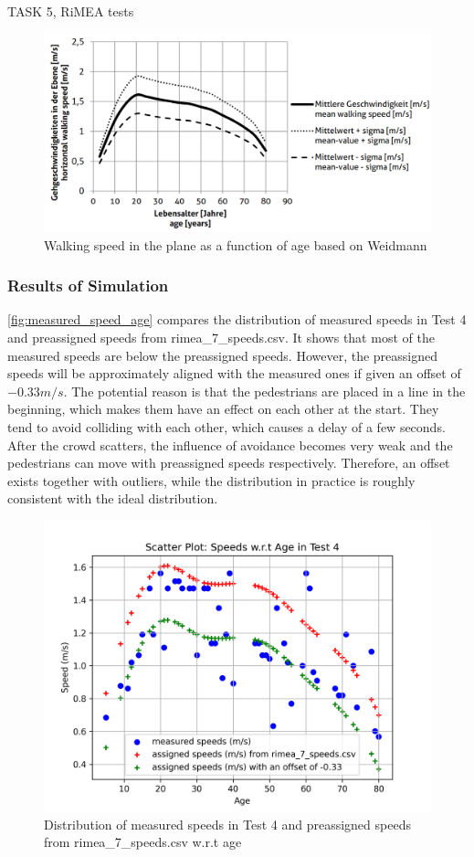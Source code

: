 \documentclass[10pt,a4paper]{article}
\begin{document}
\begin{task}{TASK 5, RiMEA tests}
\begin{figure}
    \centering
    \includegraphics[width=0.75\linewidth]{pictures/speed_age.png}
    \caption{Walking speed in the plane as a function of age based on Weidmann}
    \label{fig:speed_age}
\end{figure}

\subsubsection{Results of Simulation}

\autoref{fig:measured_speed_age} compares the distribution of measured speeds in Test 4 and preassigned speeds from rimea\_7\_speeds.csv. It shows that most of the measured speeds are below the preassigned speeds. However, the preassigned speeds will be approximately aligned with the measured ones if given an offset of $-0.33 m/s$. The potential reason is that the pedestrians are placed in a line in the beginning, which makes them have an effect on each other at the start. They tend to avoid colliding with each other, which causes a delay of a few seconds. After the crowd scatters, the influence of avoidance becomes very weak and the pedestrians can move with preassigned speeds respectively. Therefore, an offset exists together with outliers, while the distribution in practice is roughly consistent with the ideal distribution.

\begin{figure}
    \centering
    \includegraphics[width=1\linewidth]{pictures/measured_speed_age.png}
    \caption{Distribution of measured speeds in Test 4 and preassigned speeds from rimea\_7\_speeds.csv w.r.t age}
    \label{fig:measured_speed_age}
\end{figure}

\end{task}



\end{document}
